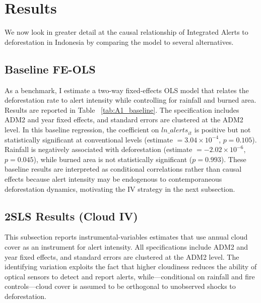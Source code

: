 \documentclass[hidelinks,12pt]{article}
\begin{document}
\section{Results} \label{sec:result}
We now look in greater detail at the causal relationship of Integrated Alerts to deforestation in Indonesia by comparing the model to several alternatives.


\subsection{Baseline FE-OLS} \label{baseols}
As a benchmark, I estimate a two-way fixed-effects OLS model that relates the deforestation rate to alert intensity while controlling for rainfall and burned area. Results are reported in Table ~\ref{tab:A1_baseline}. The specification includes ADM2 and year fixed effects, and standard errors are clustered at the ADM2 level. In this baseline regression, the coefficient on $\textit{ln\_alerts}_{it}$ is positive but not statistically significant at conventional levels (estimate $=3.04\times10^{-4}$, $p=0.105$). Rainfall is negatively associated with deforestation (estimate $=-2.02\times10^{-6}$, $p=0.045$), while burned area is not statistically significant ($p=0.993$). These baseline results are interpreted as conditional correlations rather than causal effects because alert intensity may be endogenous to contemporaneous deforestation dynamics, motivating the IV strategy in the next subsection.



\label{tab:A1_baseline}


\subsection{2SLS Results (Cloud IV)}
This subsection reports instrumental-variables estimates that use annual cloud cover as an instrument for alert intensity. All specifications include ADM2 and year fixed effects, and standard errors are clustered at the ADM2 level. The identifying variation exploits the fact that higher cloudiness reduces the ability of optical sensors to detect and report alerts, while—conditional on rainfall and fire controls—cloud cover is assumed to be orthogonal to unobserved shocks to deforestation.
\end{document}
